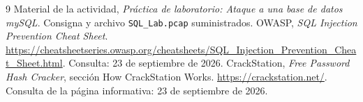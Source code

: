 \documentclass[11pt,a4paper]{article}
\begin{document}
\begin{thebibliography}{9}
Material de la actividad, \emph{Práctica de laboratorio: Ataque a una base de
datos mySQL}. Consigna y archivo \texttt{SQL\_Lab.pcap} suministrados.
OWASP, \emph{SQL Injection Prevention Cheat Sheet}.
\url{https://cheatsheetseries.owasp.org/cheatsheets/SQL_Injection_Prevention_Cheat_Sheet.html}.
Consulta: 23 de septiembre de 2026.
CrackStation, \emph{Free Password Hash Cracker}, sección How CrackStation Works.
\url{https://crackstation.net/}. Consulta de la página informativa:
23 de septiembre de 2026.
\end{thebibliography}
\end{document}
